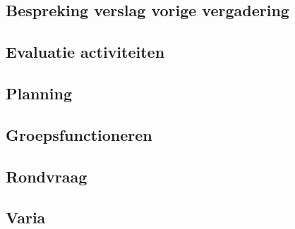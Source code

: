 \documentclass[a4paper,kulak]{kulakarticle} %
\begin{document}
\subsection{Bespreking verslag vorige vergadering}

\subsection{Evaluatie activiteiten}

\subsection{Planning}

\subsection{Groepsfunctioneren}

\subsection{Rondvraag}

\subsection{Varia}
\end{document}

